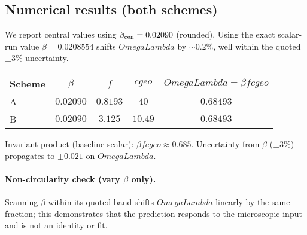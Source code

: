 \documentclass[aps,prd,onecolumn,superscriptaddress,nofootinbib]{revtex4-2}
\def\OmL{OmegaLambda}%
\def\cgeo{cgeo}%
\newcommand{\OmL}{\Omega_\Lambda}
\newcommand{\cgeo}{c_{\rm geo}}
\begin{document}
\subsection{Numerical results (both schemes)}
\label{sec:numerics}
We report central values using \(\beta_{\rm cen}=0.02090\) (rounded). Using the exact scalar-run value \(\beta=0.0208554\) shifts \(\OmL\) by \(\sim 0.2\%\), well within the quoted \(\pm 3\%\) uncertainty.
\begin{center}
\begin{tabular}{l|c|c|c|c}
\hline
Scheme & \(\beta\) & \(f\) & \(\cgeo\) & \(\OmL=\beta f \cgeo\) \\ \hline
A & \(0.02090\) & \(0.8193\) & \(40\) & \(0.68493\) \\
B & \(0.02090\) & \(3.125\) & \(10.49\) & \(0.68493\) \\ \hline
\end{tabular}
\end{center}
\noindent
Invariant product (baseline scalar): \(\beta f \cgeo \approx 0.685\).
Uncertainty from \(\beta\) (\(\pm3\%\)) propagates to \(\pm 0.021\) on \(\OmL\).

\paragraph*{Non-circularity check (vary \(\beta\) only).}
Scanning \(\beta\) within its quoted band shifts \(\OmL\) linearly by the same fraction; this demonstrates that the prediction responds to the microscopic input and is not an identity or fit.

\end{document}
